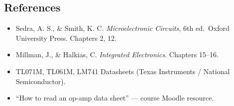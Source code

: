 \documentclass[
  11pt,
]{article}
\providecommand{\tightlist}{%
  \setlength{\itemsep}{0pt}\setlength{\parskip}{0pt}}
\begin{document}
\subsection{References}\label{references}

\begin{itemize}
\tightlist
\item
  Sedra, A. S., \& Smith, K. C. \emph{Microelectronic Circuits}, 6th
  ed.~Oxford University Press. Chapters 2, 12.
\item
  Millman, J., \& Halkias, C. \emph{Integrated Electronics}. Chapters
  15--16.
\item
  TL071M, TL061M, LM741 Datasheets (Texas Instruments / National
  Semiconductor).
\item
  ``How to read an op-amp data sheet'' --- course Moodle resource.
\end{itemize}
\end{document}
